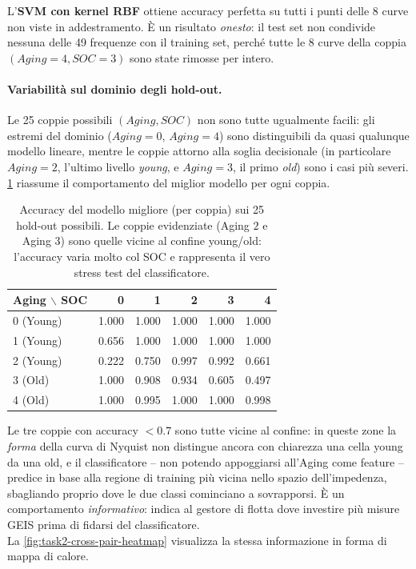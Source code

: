 L'\textbf{SVM con kernel RBF} ottiene accuracy perfetta su tutti i
punti delle 8 curve non viste in addestramento. È un risultato
\emph{onesto}: il test set non condivide nessuna delle 49 frequenze
con il training set, perché tutte le 8 curve della coppia
$(Aging = 4, SOC = 3)$ sono state rimosse per intero.

\paragraph{Variabilità sul dominio degli hold-out.} Le 25 coppie possibili
$(Aging, SOC)$ non sono tutte ugualmente facili: gli estremi del dominio
($Aging = 0$, $Aging = 4$) sono distinguibili da quasi qualunque modello
lineare, mentre le coppie attorno alla soglia decisionale (in particolare
$Aging = 2$, l'ultimo livello \emph{young}, e $Aging = 3$, il primo
\emph{old}) sono i casi più severi. \cref{tab:task2-cross-pair} riassume
il comportamento del miglior modello per ogni coppia.

\begin{table}[H]
  \centering
  \caption{Accuracy del modello migliore (per coppia) sui 25 hold-out
  possibili. Le coppie evidenziate (Aging $2$ e Aging $3$) sono quelle
  vicine al confine young/old: l'accuracy varia molto col SOC e
  rappresenta il vero stress test del classificatore.}
  \label{tab:task2-cross-pair}
  \small
  \begin{tabular}{lrrrrr}
    \toprule
    Aging $\backslash$ SOC & 0 & 1 & 2 & 3 & 4 \\
    \midrule
    0 (Young) & 1.000 & 1.000 & 1.000 & 1.000 & 1.000 \\
    1 (Young) & 0.656 & 1.000 & 1.000 & 1.000 & 1.000 \\
    \rowcolor{gray!10}
    2 (Young) & 0.222 & 0.750 & 0.997 & 0.992 & 0.661 \\
    \rowcolor{gray!10}
    3 (Old)   & 1.000 & 0.908 & 0.934 & 0.605 & 0.497 \\
    4 (Old)   & 1.000 & 0.995 & 1.000 & 1.000 & 0.998 \\
    \bottomrule
  \end{tabular}
\end{table}

Le tre coppie con accuracy $< 0.7$ sono tutte vicine al confine: in queste
zone la \emph{forma} della curva di Nyquist non distingue ancora con
chiarezza una cella young da una old, e il classificatore -- non potendo
appoggiarsi all'Aging come feature -- predice in base alla regione di
training più vicina nello spazio dell'impedenza, sbagliando proprio dove
le due classi cominciano a sovrapporsi. È un comportamento \emph{informativo}:
indica al gestore di flotta dove investire più misure GEIS prima di
fidarsi del classificatore. \\La \cref{fig:task2-cross-pair-heatmap}
visualizza la stessa informazione in forma di mappa di calore.

